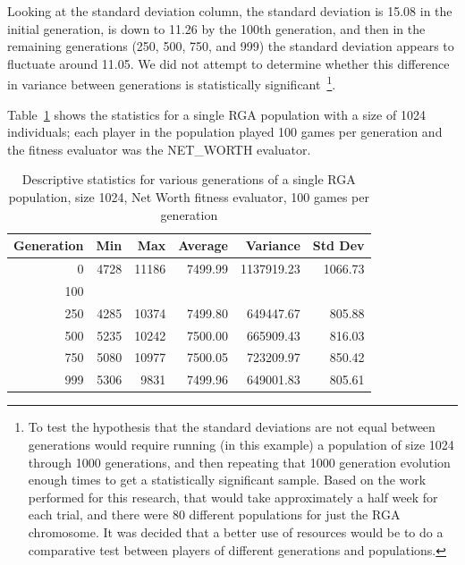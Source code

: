 Looking at the standard deviation column, the standard deviation is 15.08 in the
initial generation, is down to 11.26 by the 100th generation, and then in the
remaining generations (250, 500, 750, and 999) the standard deviation appears to
fluctuate around 11.05. We did not attempt to determine whether this difference
in variance between generations is statistically significant~\footnote{To test
the hypothesis that the standard deviations are not equal between generations
would require running (in this example) a population of size 1024 through 1000
generations, and then repeating that 1000 generation evolution enough times to
get a statistically significant sample. Based on the work performed for this
research, that would take approximately a half week for each trial, and there
were 80 different populations for just the RGA chromosome. It was decided that a
better use of resources would be to do a comparative test between players of
different generations and populations.}.

Table~\ref{table-stats-for-s1024-n100-netw} shows the statistics for a single
RGA population with a size of 1024 individuals; each player in the population
played 100 games per generation and the fitness evaluator was the NET\_WORTH
evaluator.

\begin{table}[ht]
\begin{center}
\begin{tabular}{ | r || r | r | r | r | r |}
\hline                        
Generation & Min & Max & Average & Variance & Std Dev \\ \hline \hline
0   & 4728 & 11186 & 7499.99 & 1137919.23 & 1066.73 \\ \hline
100 & & & & & \\ \hline 
250 & 4285 & 10374 & 7499.80 &  649447.67 & 805.88 \\ \hline
500 & 5235 & 10242 & 7500.00 & 665909.43 & 816.03 \\ \hline
750 & 5080 & 10977 & 7500.05 & 723209.97 & 850.42 \\ \hline
999 & 5306 & 9831 & 7499.96 & 649001.83 & 805.61 \\ \hline
\end{tabular}
\caption{Descriptive statistics for various generations of a single RGA
population, size 1024, Net Worth fitness evaluator, 100 games per generation}
\label{table-stats-for-s1024-n100-netw}
\end{center}
\end{table}

